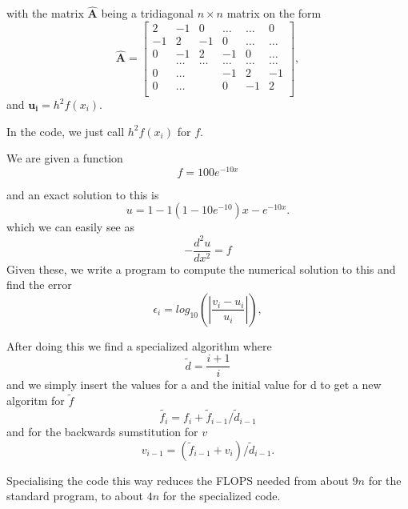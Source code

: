 \documentclass[10pt,showpacs,preprintnumbers,footinbib,amsmath,amssymb,aps,prl,twocolumn,groupedaddress,superscriptaddress,showkeys]{revtex4-1}
\begin{document}
with the matrix $\mathbf{\hat{A}}$ being a tridiagonal $n\times n$ matrix on the form
\[
    \mathbf{\hat{A}} = \begin{bmatrix}
                           2& -1& 0 &\dots   & \dots &0 \\
                           -1 & 2 & -1 &0 &\dots &\dots \\
                           0&-1 &2 & -1 & 0 & \dots \\
                           & \dots   & \dots &\dots   &\dots & \dots \\
                           0&\dots   &  &-1 &2& -1 \\
                           0&\dots    &  & 0  &-1 & 2 \\
                      \end{bmatrix},
\]
and $\mathbf{u_i} = h^2 f(x_i)$.

In the code, we just call $h^2 f(x_i)$ for $f$.

We are given a function 
\begin{equation*}
f = 100e^{-10x}
\end{equation*}

and an exact solution to this is
\begin{equation*}
u = 1 - 1(1 - 10e^{-10})x - e^{-10x}.
\end{equation*}
which we can easily see as 
\begin{equation*}
-\frac{d^2u}{dx^2} = f
\end{equation*}
Given these, we write a program to compute the numerical solution to this and find the error
\[
   \epsilon_i=log_{10}\left(\left|\frac{v_i-u_i}
                 {u_i}\right|\right),
\]

After doing this we find a specialized algorithm where
\begin{equation*}
\tilde{d} = \frac{i+1}{i}
\end{equation*}
and we simply insert the values for a and the initial value for d to get a new algoritm for $\tilde{f}$
\begin{equation*}
\tilde{f_i} = f_i + \tilde{f}_{i-1}/\tilde{d}_{i-1}
\end{equation*}
and for the backwards sumstitution for $v$
\begin{equation*}
v_{i-1} = (\tilde{f}_{i-1} + v_{i})/\tilde{d}_{i-1}.
\end{equation*}

Specialising the code this way reduces the FLOPS needed from about $9n$ for the standard program, to about $4n$ for the specialized code.
\end{document}
